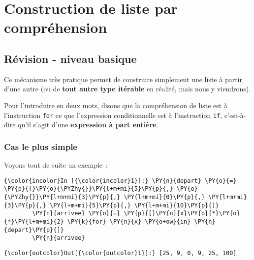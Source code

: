     
    
    
    

    

    \hypertarget{construction-de-liste-par-compruxe9hension}{%
\section{Construction de liste par
compréhension}\label{construction-de-liste-par-compruxe9hension}}

    \hypertarget{ruxe9vision---niveau-basique}{%
\subsection{Révision - niveau
basique}\label{ruxe9vision---niveau-basique}}

    Ce mécanisme très pratique permet de construire simplement une liste à
partir d'une autre (ou de \textbf{tout autre type itérable} en réalité,
mais nous y viendrons).

Pour l'introduire en deux mots, disons que la compréhension de liste est
à l'instruction \texttt{for} ce que l'expression conditionnelle est à
l'instruction \texttt{if}, c'est-à-dire qu'il s'agit d'une
\textbf{expression à part entière}.

    \hypertarget{cas-le-plus-simple}{%
\subsubsection{Cas le plus simple}\label{cas-le-plus-simple}}

    Voyons tout de suite un exemple~:

    \begin{Verbatim}[commandchars=\\\{\},frame=single,framerule=0.3mm,rulecolor=\color{cellframecolor}]
{\color{incolor}In [{\color{incolor}1}]:} \PY{n}{depart} \PY{o}{=} \PY{p}{(}\PY{o}{\PYZhy{}}\PY{l+m+mi}{5}\PY{p}{,} \PY{o}{\PYZhy{}}\PY{l+m+mi}{3}\PY{p}{,} \PY{l+m+mi}{0}\PY{p}{,} \PY{l+m+mi}{3}\PY{p}{,} \PY{l+m+mi}{5}\PY{p}{,} \PY{l+m+mi}{10}\PY{p}{)}
        \PY{n}{arrivee} \PY{o}{=} \PY{p}{[}\PY{n}{x}\PY{o}{*}\PY{o}{*}\PY{l+m+mi}{2} \PY{k}{for} \PY{n}{x} \PY{o+ow}{in} \PY{n}{depart}\PY{p}{]}
        \PY{n}{arrivee}
\end{Verbatim}


\begin{Verbatim}[commandchars=\\\{\},frame=single,framerule=0.3mm,rulecolor=\color{cellframecolor}]
{\color{outcolor}Out[{\color{outcolor}1}]:} [25, 9, 0, 9, 25, 100]
\end{Verbatim}
            
